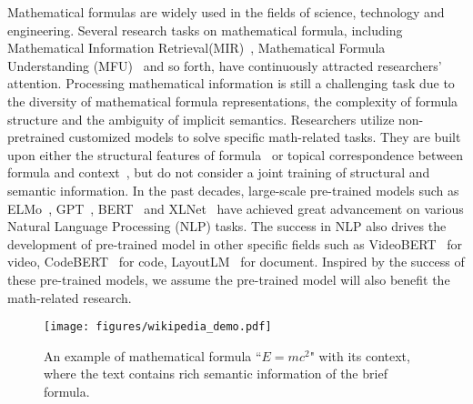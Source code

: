 \documentclass{article}
\begin{document}
Mathematical formulas are widely used in the fields of science, technology and engineering. Several research tasks on mathematical formula, including Mathematical Information Retrieval(MIR)~\cite{yuan2016mathematical,TangentS,TangentCFT}, Mathematical Formula Understanding (MFU)~\cite{jiang2018mathematics,yuanke} and so forth, have continuously attracted researchers’ attention. Processing mathematical information is still a challenging task due to the diversity of mathematical formula representations, the complexity of formula structure and the ambiguity of implicit semantics. Researchers utilize non-pretrained customized models to solve specific math-related tasks. They are built upon either the structural features of formula~\cite{TangentCFT} or topical correspondence between formula and context~\cite{Topiceq}, but do not consider a joint training of structural and semantic information. In the past decades, large-scale pre-trained models such as ELMo~\cite{ELMo}, GPT~\cite{GPT}, BERT~\cite{BERT} and XLNet~\cite{XLNet} have achieved great advancement on various Natural Language Processing (NLP) tasks. The success in NLP also drives the development of pre-trained model in other specific fields such as VideoBERT~\cite{VideoBERT} for video, CodeBERT~\cite{codebert} for code, LayoutLM~\cite{LayoutLM} for document. Inspired by the success of these pre-trained models, we assume the pre-trained model will also benefit the math-related research.


\begin{figure}[t]
\vskip -0.2in
\begin{center}
\centerline{\texttt{[image: figures/wikipedia\_demo.pdf]}}
\vskip -0.1in
\caption{An example of mathematical formula ``$E=mc^2$" with its context, where the text contains rich semantic information of the brief formula.}
\label{figure-wikipedia_demo}
\end{center}
\vskip -0.35in
\end{figure}
\end{document}
